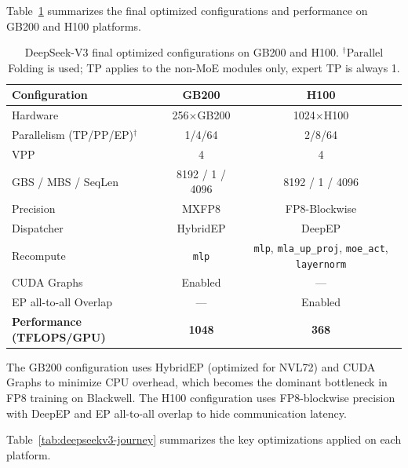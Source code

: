 \documentclass[10pt,logo,copyright]{nvidiatechreport}
\begin{document}
Table~\ref{tab:deepseekv3-config} summarizes the final optimized configurations and performance on GB200 and H100 platforms.

\begin{table}[ht]
\centering
\caption{DeepSeek-V3 final optimized configurations on GB200 and H100. $^\dagger$Parallel Folding is used; TP applies to the non-MoE modules only, expert TP is always 1.}
\label{tab:deepseekv3-config}
\begin{tabular}{lcc}
\toprule
\textbf{Configuration} & \textbf{GB200} & \textbf{H100} \\
\midrule
Hardware & 256$\times$GB200 & 1024$\times$H100 \\
Parallelism (TP/PP/EP)$^\dagger$ & 1/4/64 & 2/8/64 \\
VPP & 4 & 4 \\
GBS / MBS / SeqLen & 8192 / 1 / 4096 & 8192 / 1 / 4096 \\
Precision & MXFP8 & FP8-Blockwise \\
Dispatcher & HybridEP & DeepEP \\
Recompute & \texttt{mlp} & \texttt{mlp}, \texttt{mla\_up\_proj}, \texttt{moe\_act}, \texttt{layernorm} \\
CUDA Graphs & Enabled & --- \\
EP all-to-all Overlap & --- & Enabled \\
\midrule
\textbf{Performance (TFLOPS/GPU)} & \textbf{1048} & \textbf{368} \\
\bottomrule
\end{tabular}
\end{table}

The GB200 configuration uses HybridEP (optimized for NVL72) and CUDA Graphs to minimize CPU overhead, which becomes the dominant bottleneck in FP8 training on Blackwell. The H100 configuration uses FP8-blockwise precision with DeepEP and EP all-to-all overlap to hide communication latency.

Table~\ref{tab:deepseekv3-journey} summarizes the key optimizations applied on each platform.
\end{document}
